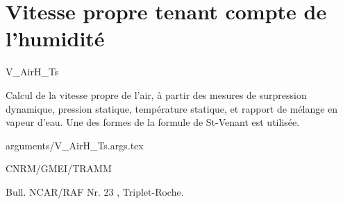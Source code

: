 %
\section{Vitesse propre tenant compte de l'humidit\'e}

 {\sf V\_AirH\_Ts}

Calcul de la vitesse propre de l'air, \`a 
partir des mesures de surpression dynamique, pression 
statique, temp\'erature statique, et rapport de 
m\'elange en vapeur d'eau.\newline
Une des formes de la formule de St-Venant est utilis\'ee.

\bigskip
 {arguments/V_AirH_Ts.args.tex}




CNRM/GMEI/TRAMM

Bull. NCAR/RAF Nr. 23 \cite{RAF-23},
Triplet-Roche\cite{Triplet-Roche}.
